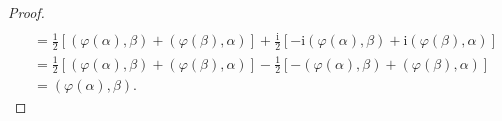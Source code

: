 \documentclass[../../main.tex]{subfiles}
\begin{document}
\begin{proof}
\begin{align*}
\\
&=\frac{1}{2}\left[ \left( \varphi \left( \alpha \right) ,\beta \right) +\left( \varphi \left( \beta \right) ,\alpha \right) \right] +\frac{\mathrm{i}}{2}\left[ -\mathrm{i}\left( \varphi \left( \alpha \right) ,\beta \right) +\mathrm{i}\left( \varphi \left( \beta \right) ,\alpha \right) \right] 
\\
&=\frac{1}{2}\left[ \left( \varphi \left( \alpha \right) ,\beta \right) +\left( \varphi \left( \beta \right) ,\alpha \right) \right] -\frac{1}{2}\left[ -\left( \varphi \left( \alpha \right) ,\beta \right) +\left( \varphi \left( \beta \right) ,\alpha \right) \right] 
\\
&=\left( \varphi \left( \alpha \right) ,\beta \right) .
\end{align*}
\end{proof}
\end{document}
